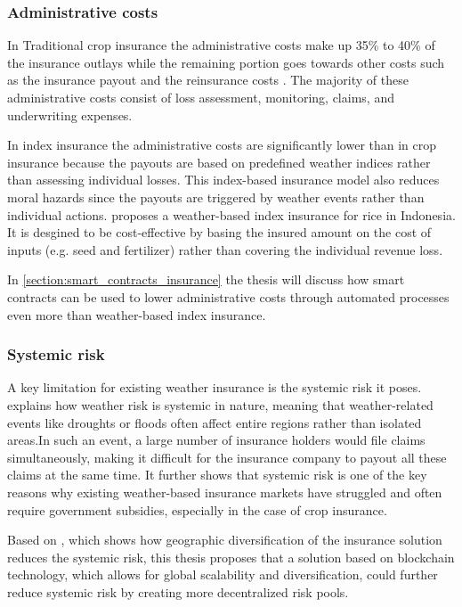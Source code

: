  \subsubsection{Administrative costs}
 
 In Traditional crop insurance the administrative costs make up 35\% to 40\% of the insurance outlays while the remaining portion goes towards other costs such as the insurance payout and the reinsurance costs \autocite{glauber2004crop}. The majority of these administrative costs consist of loss assessment, monitoring, claims, and underwriting expenses.
 
 In index insurance the administrative costs are significantly lower than in crop insurance because the payouts are based on predefined weather indices rather than assessing individual losses. This index-based insurance model also reduces moral hazards since the payouts are triggered by weather events rather than individual actions. \autocite{kusuma2018viable} proposes a weather-based index insurance for rice in Indonesia. It  is desgined to be cost-effective by basing the insured amount on the cost of inputs (e.g. seed and fertilizer) rather than covering the individual revenue loss.
 
 In \cref{section:smart_contracts_insurance} the thesis will discuss how smart contracts can be used to lower administrative costs through automated processes even more than weather-based index insurance.
 
 \subsubsection{Systemic risk}
 
 A key limitation for existing weather insurance is the systemic risk it poses. \autocite{xu2010systemic} explains how weather risk is systemic in nature, meaning that weather-related events like droughts or floods often affect entire regions rather than isolated areas.In such an event, a large number of insurance holders would file claims simultaneously, making it difficult for the insurance company to payout all these claims at the same time. It further shows that systemic risk is one of the key reasons why existing weather-based insurance markets have struggled and often require government subsidies, especially in the case of crop insurance. 
 
 Based on \autocite{salgueiro2021diversification}, which shows how geographic diversification of the insurance solution reduces the systemic risk, this thesis proposes that a solution based on blockchain technology, which allows for global scalability and diversification, could further reduce systemic risk by creating more decentralized risk pools.
 
